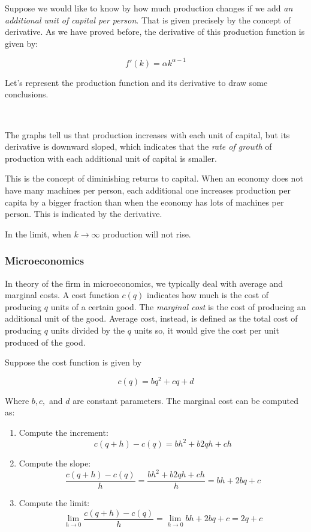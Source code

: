 \documentclass[11pt]{article}
\providecommand{\tightlist}{%
      \setlength{\itemsep}{0pt}\setlength{\parskip}{0pt}}
\theoremstyle{definition}
\theoremstyle{plain}
\begin{document}
Suppose we would like to know by how much production changes if we add
\emph{an additional unit of capital per person}. That is given precisely
by the concept of derivative. As we have proved before, the derivative
of this production function is given by:

\[
f'(k) = \alpha k^{\alpha-1}
\]

Let's represent the production function and its derivative to draw some
conclusions.

    \begin{center}
    \end{center}
    { \hspace*{\fill} \\}
    
    The graphs tell us that production increases with each unit of capital,
but its derivative is downward sloped, which indicates that the
\emph{rate of growth} of production with each additional unit of capital
is smaller.

This is the concept of diminishing returns to capital. When an economy
does not have many machines per person, each additional one increases
production per capita by a bigger fraction than when the economy has
lots of machines per person. This is indicated by the derivative.

In the limit, when \(k\rightarrow\infty\) production will not rise.

\subsubsection{Microeconomics}\label{microeconomics}

In theory of the firm in microeconomics, we typically deal with average
and marginal costs. A cost function \(c(q)\) indicates how much is the
cost of producing \(q\) units of a certain good. The \emph{marginal
cost} is the cost of producing an additional unit of the good. Average
cost, instead, is defined as the total cost of producing \(q\) units
divided by the \(q\) units so, it would give the cost per unit produced
of the good.

Suppose the cost function is given by

\[
c(q) = bq^2 + cq + d
\]

Where \(b, c,\) and \(d\) are constant parameters. The marginal cost can
be computed as:

\begin{enumerate}
\def\labelenumi{\arabic{enumi}.}
\tightlist
\item
  Compute the increment: \[
  c(q+h)-c(q) = bh^2 + b2qh + ch
  \]
\item
  Compute the slope: \[
  \frac{c(q+h)-c(q)}{h} = \frac{bh^2 + b2qh + ch}{h} = bh + 2bq + c
  \]
\item
  Compute the limit: \[
  \lim_{h\rightarrow 0}{\frac{c(q+h)-c(q)}{h}} = \lim_{h\rightarrow 0}{bh + 2bq + c} = 2q + c
  \]
\end{enumerate}
\end{document}
